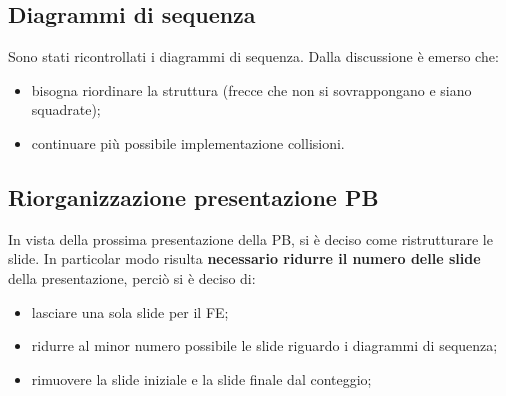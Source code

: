 \subsection{Diagrammi di sequenza}
Sono stati ricontrollati i diagrammi di sequenza. Dalla discussione è emerso che:
\begin{itemize}
	\item bisogna riordinare la struttura (frecce che non si sovrappongano e siano squadrate);
	\item continuare più possibile implementazione collisioni.
\end{itemize}

\subsection{Riorganizzazione presentazione PB}
In vista della prossima presentazione della PB, si è deciso come ristrutturare le slide. In particolar modo risulta \textbf{necessario ridurre il numero delle slide} della presentazione, perciò si è deciso di:
\begin{itemize}
	\item lasciare una sola slide per il FE;
	\item ridurre al minor numero possibile le slide riguardo i diagrammi di sequenza; 
	\item rimuovere la slide iniziale e la slide finale dal conteggio; 
\end{itemize}
